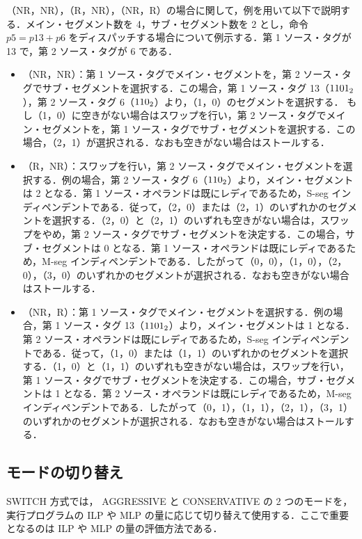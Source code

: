 （NR，NR），（R，NR），（NR，R）の場合に関して，例を用いて以下で説明する．メイン・セグメント数を 4，サブ・セグメント数を 2 とし，命令 $p5 = p13 + p6$ をディスパッチする場合について例示する．第 1 ソース・タグが 13 で，第 2 ソース・タグが 6 である．
\begin{itemize}
  \item （NR，NR）：第 1 ソース・タグでメイン・セグメントを，第 2 ソース・タグでサブ・セグメントを選択する．この場合，第 1 ソース・タグ 13（${\rm 1101_2}$），第 2 ソース・タグ 6（${\rm 110_2}$）より，（1，0）のセグメントを選択する． もし（1，0）に空きがない場合はスワップを行い，第 2 ソース・タグでメイン・セグメントを，第 1 ソース・タグでサブ・セグメントを選択する．この場合，（2，1）が選択される．なおも空きがない場合はストールする．
  \item （R，NR）：スワップを行い，第 2 ソース・タグでメイン・セグメントを選択する．例の場合，第 2 ソース・タグ 6（${\rm 110_2}$）より，メイン・セグメントは 2 となる．第 1 ソース・オペランドは既にレディであるため，S-seg インディペンデントである．従って，（2，0）または（2，1）のいずれかのセグメントを選択する．（2，0）と（2，1）のいずれも空きがない場合は，スワップをやめ，第 2 ソース・タグでサブ・セグメントを決定する．この場合，サブ・セグメントは 0 となる．第 1 ソース・オペランドは既にレディであるため，M-seg インディペンデントである．したがって（0，0），（1，0），（2，0），（3，0）のいずれかのセグメントが選択される．なおも空きがない場合はストールする．
  \item （NR，R）：第 1 ソース・タグでメイン・セグメントを選択する．例の場合，第 1 ソース・タグ 13（${\rm 1101_2}$）より，メイン・セグメントは 1 となる．第 2 ソース・オペランドは既にレディであるため，S-seg インディペンデントである．従って，（1，0）または（1，1）のいずれかのセグメントを選択する．（1，0）と（1，1）のいずれも空きがない場合は，スワップを行い，第 1 ソース・タグでサブ・セグメントを決定する．この場合，サブ・セグメントは 1 となる．第 2 ソース・オペランドは既にレディであるため，M-seg インディペンデントである．したがって（0，1），（1，1），（2，1），（3，1）のいずれかのセグメントが選択される．なおも空きがない場合はストールする．
\end{itemize}


\subsection{モードの切り替え}
SWITCH 方式では， AGGRESSIVE と CONSERVATIVE の 2 つのモードを，実行プログラムの ILP や MLP の量に応じて切り替えて使用する．ここで重要となるのは ILP や MLP の量の評価方法である．

